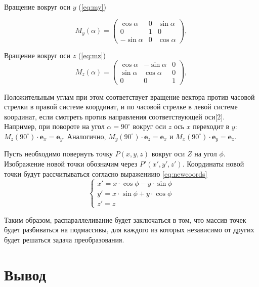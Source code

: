 Вращение вокруг оси $y$ (\ref{eq:my})

\begin{equation}
	\label{eq:my}
	M_{y}(\alpha) = \begin{pmatrix}
		\cos\alpha & 0  & \sin\alpha\\
		0 & 1  & 0\\
		-\sin\alpha & 0 & \cos\alpha
	\end{pmatrix},
\end{equation}


Вращение вокруг оси $z$ (\ref{eq:mz})
\begin{equation}
	\label{eq:mz}
	M_{z}(\alpha) = \begin{pmatrix}
		\cos\alpha & -\sin\alpha  & 0\\
		\sin\alpha & \cos\alpha  & 0\\
		0 & 0 & 1
	\end{pmatrix},
\end{equation}

Положительным углам при этом соответствует вращение вектора против 
часовой стрелки в правой системе координат, и по часовой стрелке в 
левой системе координат, если смотреть против направления 
соответствующей оси[2]. Например, при повороте на угол 
$\alpha=90^{\circ }$ вокруг оси $z$ ось $x$ переходит в $y$:
$M_{z}(90^{\circ })\cdot \mathbf{e}_{x}=\mathbf{e}_{y}$. 
Аналогично, $M_{y}(90^{\circ })\cdot \mathbf{e}_{z}=\mathbf{e}_{x}$ 
и $M_{x}(90^{\circ })\cdot \mathbf{e}_{y}=\mathbf{e}_{z}$. 

Пусть необходимо повернуть точку $P(x, y, z)$ вокруг оси $Z$ на угол $\phi$. 
Изображение новой точки обозначим через $P'(x', y', z')$. Координаты новой точки
будут рассчитываться согласно выражениию \ref{eq:newcoords}
\begin{equation}
	\label{eq:newcoords}
	\begin{cases}
		x' = x \cdot \cos\phi - y \cdot \sin\phi\\
		y' = x \cdot \sin\phi + y \cdot \cos\phi\\
		z' = z
	\end{cases}
\end{equation}


Таким образом, распараллеливание будет заключаться в том, что
массив точек будет разбиваться на подмассивы, для каждого из которых
независимо от других будет решаться задача преобразования.

\section{Вывод}

